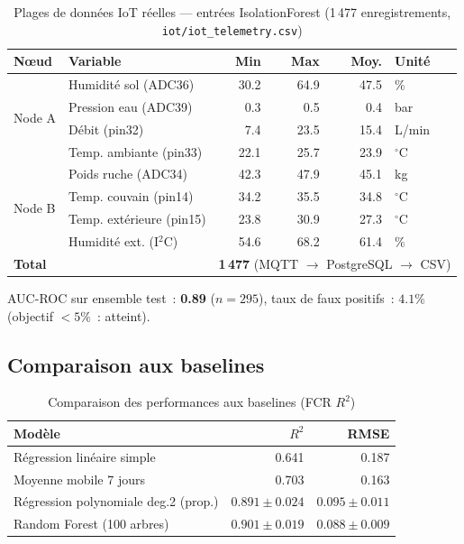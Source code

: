 \begin{table}[H]
\caption{Plages de données IoT réelles --- entrées IsolationForest
(1\,477 enregistrements, \texttt{iot/iot\_telemetry.csv})}
\label{tab:iot_ranges}
\centering
\begin{tabular}{@{}llrrrl@{}}
\toprule
\textbf{Nœud} & \textbf{Variable} & \textbf{Min} & \textbf{Max}
  & \textbf{Moy.} & \textbf{Unité} \\
\midrule
\multirow{4}{*}{Node A}
  & Humidité sol (ADC36)   & 30.2 & 64.9 & 47.5 & \% \\
  & Pression eau (ADC39)   &  0.3 &  0.5 &  0.4 & bar \\
  & Débit (pin32)          &  7.4 & 23.5 & 15.4 & L/min \\
  & Temp. ambiante (pin33) & 22.1 & 25.7 & 23.9 & $^{\circ}$C \\
\midrule
\multirow{4}{*}{Node B}
  & Poids ruche (ADC34)      & 42.3 & 47.9 & 45.1 & kg \\
  & Temp. couvain (pin14)    & 34.2 & 35.5 & 34.8 & $^{\circ}$C \\
  & Temp. extérieure (pin15) & 23.8 & 30.9 & 27.3 & $^{\circ}$C \\
  & Humidité ext. (I$^2$C)   & 54.6 & 68.2 & 61.4 & \% \\
\midrule
\multicolumn{2}{l}{\textbf{Total}} & \multicolumn{4}{l}{\textbf{1\,477} (MQTT $\rightarrow$ PostgreSQL $\rightarrow$ CSV)} \\
\bottomrule
\end{tabular}
\end{table}

AUC-ROC sur ensemble test~: \textbf{0.89} ($n = 295$), taux de faux positifs~: $4.1\%$
(objectif $< 5\%$~: atteint).

\subsection{Comparaison aux baselines}

\begin{table}[H]
\centering
\caption{Comparaison des performances aux baselines (FCR $R^2$)}
\label{tab:baseline}
\begin{tabular}{lrr}
\toprule
\textbf{Modèle} & $R^2$ & \textbf{RMSE} \\
\midrule
Régression linéaire simple          & 0.641              & 0.187 \\
Moyenne mobile 7 jours              & 0.703              & 0.163 \\
Régression polynomiale deg.2 (prop.)& $0.891 \pm 0.024$  & $0.095 \pm 0.011$ \\
Random Forest (100 arbres)          & $0.901 \pm 0.019$  & $0.088 \pm 0.009$ \\
\bottomrule
\end{tabular}
\end{table}

